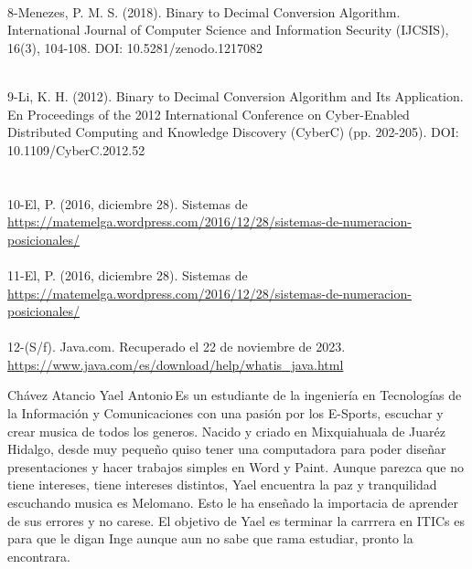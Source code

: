 \documentclass{IEEEcsmag}
\begin{document}
\begin{thebibliography}{1}
  \\
  8-Menezes, P. M. S. (2018). Binary to Decimal Conversion Algorithm. International Journal of Computer Science and Information Security (IJCSIS), 16(3), 104-108. DOI: 10.5281/zenodo.1217082

 \\
  9-Li, K. H. (2012). Binary to Decimal Conversion Algorithm and Its Application. En Proceedings of the 2012 International Conference on Cyber-Enabled Distributed Computing and Knowledge Discovery (CyberC) (pp. 202-205). DOI: 10.1109/CyberC.2012.52
   \\
   \\
  \\
   10-El, P. (2016, diciembre 28). Sistemas de 
   \url{https://matemelga.wordpress.com/2016/12/28/sistemas-de-numeracion-posicionales/} \\
   
   \\
   11-El, P. (2016, diciembre 28). Sistemas de 
   \url{https://matemelga.wordpress.com/2016/12/28/sistemas-de-numeracion-posicionales/} \\
   
   \\
   12-(S/f). Java.com. Recuperado el 22 de noviembre de 2023. \url{https://www.java.com/es/download/help/whatis_java.html}\\

\end{thebibliography}\vspace*{-8pt}


\begin{IEEEbiography}{Chávez Atancio Yael Antonio}{\,}Es un estudiante de la ingeniería en Tecnologías de la Información y Comunicaciones con una pasión por los E-Sports, escuchar y crear musica de todos los generos. Nacido y criado en Mixquiahuala de Juaréz Hidalgo, desde muy pequeño quiso tener una computadora para poder diseñar presentaciones y hacer trabajos simples en Word y Paint. Aunque parezca que no tiene intereses, tiene intereses distintos, Yael encuentra la paz y tranquilidad escuchando musica es Melomano. Esto le ha enseñado la importacia de aprender de sus errores y no carese. El objetivo de Yael es terminar la carrrera  en ITICs es para que le digan Inge aunque aun no sabe que rama estudiar, pronto la encontrara.
\end{IEEEbiography}
\end{document}
